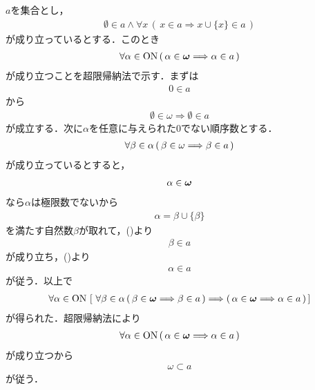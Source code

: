 	\begin{prf}
		$a$を集合とし，
		\begin{align}
			\emptyset \in a \wedge \forall x\, 
			(\, x \in a \Longrightarrow x \cup \{x\} \in a\, )
			\label{fom:thm_the_principle_of_mathematical_induction_1}
		\end{align}
		が成り立っているとする．このとき
		\begin{align}
			\forall \alpha \in \mathrm{ON}\, (\, \alpha \in {\boldsymbol \omega} \Longrightarrow \alpha \in a\, )
		\end{align}
		が成り立つことを超限帰納法で示す．まずは
		\begin{align}
			0 \in a
		\end{align}
		から
		\begin{align}
			\emptyset \in \omega \Longrightarrow \emptyset \in a
		\end{align}
		が成立する．次に$\alpha$を任意に与えられた$0$でない順序数とする．
		\begin{align}
			\forall \beta \in \alpha\, (\, \beta \in {\bf \omega} \Longrightarrow \beta \in a\, )
			\label{fom:thm_the_principle_of_mathematical_induction_2}
		\end{align}
		が成り立っているとすると，
		\begin{align}
			\alpha \in {\boldsymbol \omega}
		\end{align}
		なら$\alpha$は極限数でないから
		\begin{align}
			\alpha = \beta \cup \{\beta\}
		\end{align}
		を満たす自然数$\beta$が取れて，()より
		\begin{align}
			\beta \in a
		\end{align}
		が成り立ち，()より
		\begin{align}
			\alpha \in a
		\end{align}
		が従う．以上で
		\begin{align}
			\forall \alpha \in \ON\, \left[\ 
				\forall \beta \in \alpha\, (\, \beta \in \Natural \Longrightarrow \beta \in a\, )
				\Longrightarrow (\, \alpha \in \Natural \Longrightarrow \alpha \in a\, )\, \right]
		\end{align}
		が得られた．超限帰納法により
		\begin{align}
			\forall \alpha \in \mathrm{ON}\, (\, \alpha \in {\boldsymbol \omega} \Longrightarrow \alpha \in a\, )
		\end{align}
		が成り立つから
		\begin{align}
			\omega \subset a
		\end{align}
		が従う．
		\QED
	\end{prf}